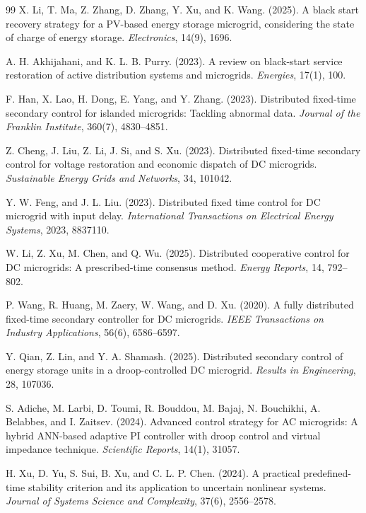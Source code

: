 \documentclass[]{interact}
\theoremstyle{plain}%
\theoremstyle{definition}
\theoremstyle{remark}
\begin{document}
\begin{thebibliography}{99}
X. Li, T. Ma, Z. Zhang, D. Zhang, Y. Xu, and K. Wang. (2025). A black start recovery strategy for a PV-based energy storage microgrid, considering the state of charge of energy storage. \emph{Electronics}, 14(9), 1696.

A. H. Akhijahani, and K. L. B. Purry. (2023). A review on black-start service restoration of active distribution systems and microgrids. \emph{Energies}, 17(1), 100.

F. Han, X. Lao, H. Dong, E. Yang, and Y. Zhang. (2023). Distributed fixed-time secondary control for islanded microgrids: Tackling abnormal data. \emph{Journal of the Franklin Institute}, 360(7), 4830–4851.

Z. Cheng, J. Liu, Z. Li, J. Si, and S. Xu. (2023). Distributed fixed-time secondary control for voltage restoration and economic dispatch of DC microgrids. \emph{Sustainable Energy Grids and Networks}, 34, 101042.

Y. W. Feng, and J. L. Liu. (2023). Distributed fixed time control for DC microgrid with input delay. \emph{International Transactions on Electrical Energy Systems}, 2023, 8837110.

W. Li, Z. Xu, M. Chen, and Q. Wu. (2025). Distributed cooperative control for DC microgrids: A prescribed-time consensus method. \emph{Energy Reports}, 14, 792–802. 

P. Wang, R. Huang, M. Zaery, W. Wang, and D. Xu. (2020). A fully distributed fixed-time secondary controller for DC microgrids. \emph{IEEE Transactions on Industry Applications}, 56(6), 6586–6597.

Y. Qian, Z. Lin, and Y. A. Shamash. (2025). Distributed secondary control of energy storage units in a droop-controlled DC microgrid. \emph{Results in Engineering}, 28, 107036.

S. Adiche, M. Larbi, D. Toumi, R. Bouddou, M. Bajaj, N. Bouchikhi, A. Belabbes, and I. Zaitsev. (2024). Advanced control strategy for AC microgrids: A hybrid ANN-based adaptive PI controller with droop control and virtual impedance technique. \emph{Scientific Reports}, 14(1), 31057.

H. Xu, D. Yu, S. Sui, B. Xu, and C. L. P. Chen. (2024). A practical predefined-time stability criterion and its application to uncertain nonlinear systems. \emph{Journal of Systems Science and Complexity}, 37(6), 2556–2578.


\end{thebibliography}
\end{document}
